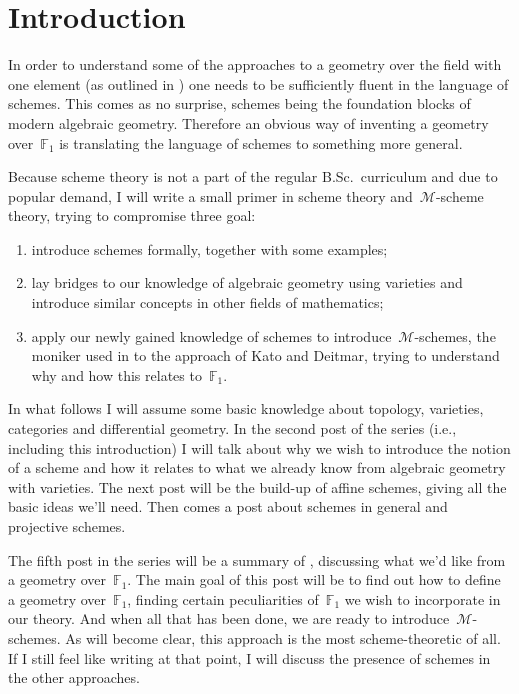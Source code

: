 \section{Introduction}

In order to understand some of the approaches to a geometry over the field with one element (as outlined in \cite{mapping-fun}) one needs to be sufficiently fluent in the language of schemes. This comes as no surprise, schemes being the foundation blocks of modern algebraic geometry. Therefore an obvious way of inventing a geometry over~$\mathbb{F}_1$ is translating the language of schemes to something more general.

Because scheme theory is not a part of the regular B.Sc.\ curriculum and due to popular demand, I will write a small primer in scheme theory and~$\mathcal{M}$-scheme theory, trying to compromise three goal:
\begin{enumerate}
  \item introduce schemes formally, together with some examples;
  \item lay bridges to our knowledge of algebraic geometry using varieties and introduce similar concepts in other fields of mathematics;
  \item apply our newly gained knowledge of schemes to introduce~$\mathcal{M}$-schemes, the moniker used in \cite{mapping-fun} to the approach of Kato and Deitmar, trying to understand why and how this relates to~$\mathbb{F}_1$.
\end{enumerate}

In what follows I will assume some basic knowledge about topology, varieties, categories and differential geometry. In the second post of the series (i.e., including this introduction) I will talk about why we wish to introduce the notion of a scheme and how it relates to what we already know from algebraic geometry with varieties. The next post will be the build-up of affine schemes, giving all the basic ideas we'll need. Then comes a post about schemes in general and projective schemes.

The fifth post in the series will be a summary of \cite{kapranov-smirnov}, discussing what we'd like from a geometry over~$\mathbb{F}_1$. The main goal of this post will be to find out how to define a geometry over~$\mathbb{F}_1$, finding certain peculiarities of~$\mathbb{F}_1$ we wish to incorporate in our theory. And when all that has been done, we are ready to introduce~$\mathcal{M}$-schemes. As will become clear, this approach is the most scheme-theoretic of all. If I still feel like writing at that point, I will discuss the presence of schemes in the other approaches.
